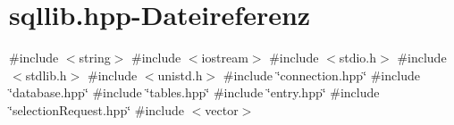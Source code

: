 \section{sqllib.\+hpp-\/\+Dateireferenz}
\label{sqllib_8hpp}
{\ttfamily \#include $<$string$>$}\newline
{\ttfamily \#include $<$iostream$>$}\newline
{\ttfamily \#include $<$stdio.\+h$>$}\newline
{\ttfamily \#include $<$stdlib.\+h$>$}\newline
{\ttfamily \#include $<$unistd.\+h$>$}\newline
{\ttfamily \#include \char`\"{}connection.\+hpp\char`\"{}}\newline
{\ttfamily \#include \char`\"{}database.\+hpp\char`\"{}}\newline
{\ttfamily \#include \char`\"{}tables.\+hpp\char`\"{}}\newline
{\ttfamily \#include \char`\"{}entry.\+hpp\char`\"{}}\newline
{\ttfamily \#include \char`\"{}selection\+Request.\+hpp\char`\"{}}\newline
{\ttfamily \#include $<$vector$>$}\newline
